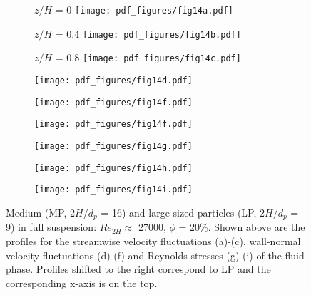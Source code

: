 \documentclass{jfm}
\begin{document}
\begin{figure}
\centering

\begin{subfigure}{.32\textwidth}
  \centering
  $z/H$ = 0
  \texttt{[image: pdf\_figures/fig14a.pdf]}
  \caption{}
  \label{fig:3_6mm_20p_Re27000_sp00mm_urms}
\end{subfigure}%
\begin{subfigure}{.32\textwidth}
  \centering
  $z/H$ = 0.4
  \texttt{[image: pdf\_figures/fig14b.pdf]}
  \caption{}
  \label{fig:3_6mm_20p_Re27000_sp10mm_urms}
\end{subfigure}
\begin{subfigure}{.32\textwidth}
  \centering
  $z/H$ = 0.8
  \texttt{[image: pdf\_figures/fig14c.pdf]}
  \caption{}
  \label{fig:3_6mm_20p_Re27000_sp20mm_urms}
\end{subfigure}

\begin{subfigure}{.32\textwidth}
  \centering
  \texttt{[image: pdf\_figures/fig14d.pdf]}
  \caption{}
  \label{fig:3_6mm_20p_Re27000_sp00mm_vrms}
\end{subfigure}%
\begin{subfigure}{.32\textwidth}
  \centering
  \texttt{[image: pdf\_figures/fig14f.pdf]}
  \caption{}
  \label{fig:3_6mm_20p_Re27000_sp10mm_vrms}
\end{subfigure}
\begin{subfigure}{.32\textwidth}
  \centering
  \texttt{[image: pdf\_figures/fig14f.pdf]}
  \caption{}
  \label{fig:3_6mm_20p_Re27000_sp20mm_vrms}
\end{subfigure}

\begin{subfigure}{.32\textwidth}
  \centering
  \texttt{[image: pdf\_figures/fig14g.pdf]}
  \caption{}
  \label{fig:3_6mm_20p_Re27000_sp00mm_uv}
\end{subfigure}%
\begin{subfigure}{.32\textwidth}
  \centering
  \texttt{[image: pdf\_figures/fig14h.pdf]}
  \caption{}
  \label{fig:3_6mm_20p_Re27000_sp10mm_uv}
\end{subfigure}
\begin{subfigure}{.32\textwidth}
  \centering
  \texttt{[image: pdf\_figures/fig14i.pdf]}
  \caption{}
  \label{fig:3_6mm_20p_Re27000_sp20mm_uv}
\end{subfigure}

\caption{Medium (MP, $2H/d_p$ = 16) and large-sized particles (LP, $2H/d_p$ = 9) in full suspension: $Re_{2H}\approx$ 27000, $\phi$ = 20\%. Shown above are the profiles for the streamwise velocity fluctuations (a)-(c), wall-normal velocity fluctuations (d)-(f) and Reynolds stresses (g)-(i) of the fluid phase. Profiles shifted to the right correspond to LP and the corresponding x-axis is on the top.}
\label{fig:3_6mm_20p_Re27000_urms_vrms_uv}
\end{figure}
\end{document}
